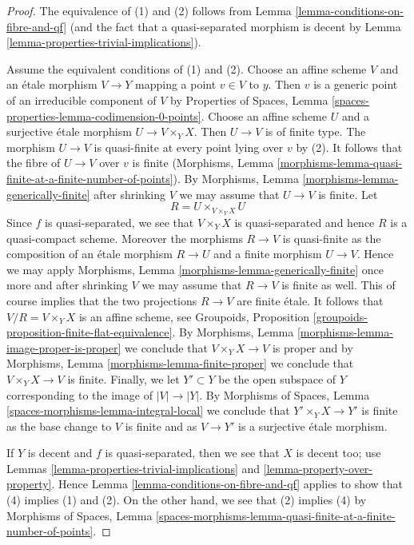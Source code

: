 \begin{proof}
The equivalence of (1) and (2) follows from
Lemma \ref{lemma-conditions-on-fibre-and-qf}
(and the fact that a quasi-separated morphism is decent by
Lemma \ref{lemma-properties-trivial-implications}).

\medskip\noindent
Assume the equivalent conditions of (1) and (2). Choose an affine scheme $V$
and an \'etale morphism $V \to Y$ mapping a point $v \in V$ to $y$. Then $v$
is a generic point of an irreducible component of $V$ by
Properties of Spaces, Lemma
\ref{spaces-properties-lemma-codimension-0-points}.
Choose an affine scheme $U$
and a surjective \'etale morphism $U \to V \times_Y X$. Then $U \to V$ is of
finite type. The morphism $U \to V$ is quasi-finite at every point lying over
$v$ by (2). It follows that the fibre of $U \to V$ over $v$ is finite
(Morphisms, Lemma
\ref{morphisms-lemma-quasi-finite-at-a-finite-number-of-points}). By
Morphisms, Lemma \ref{morphisms-lemma-generically-finite}
after shrinking $V$ we may assume that $U \to V$ is finite.
Let
$$
R = U \times_{V \times_Y X} U
$$
Since $f$ is quasi-separated, we see that $V \times_Y X$ is quasi-separated
and hence $R$ is a quasi-compact scheme. Moreover the morphisms
$R \to V$ is quasi-finite as the composition of an \'etale morphism
$R \to U$ and a finite morphism $U \to V$. Hence we may apply
Morphisms, Lemma \ref{morphisms-lemma-generically-finite}
once more and after shrinking $V$ we may assume that $R \to V$ is
finite as well. This of course implies that the two projections
$R \to V$ are finite \'etale. It follows that
$V/R = V \times_Y X$ is an affine scheme, see
Groupoids, Proposition \ref{groupoids-proposition-finite-flat-equivalence}.
By Morphisms, Lemma \ref{morphisms-lemma-image-proper-is-proper}
we conclude that $V \times_Y X \to V$ is proper and by
Morphisms, Lemma \ref{morphisms-lemma-finite-proper}
we conclude that $V \times_Y X \to V$ is finite.
Finally, we let $Y' \subset Y$ be the open subspace of $Y$
corresponding to the image of $|V| \to |Y|$.
By Morphisms of Spaces, Lemma \ref{spaces-morphisms-lemma-integral-local}
we conclude that $Y' \times_Y X \to Y'$ is finite as the base
change to $V$ is finite and as $V \to Y'$ is a surjective \'etale
morphism.

\medskip\noindent
If $Y$ is decent and $f$ is quasi-separated, then we see that
$X$ is decent too; use Lemmas
\ref{lemma-properties-trivial-implications} and
\ref{lemma-property-over-property}.
Hence Lemma \ref{lemma-conditions-on-fibre-and-qf}
applies to show that (4) implies (1) and (2). On the other hand,
we see that (2) implies (4) by Morphisms of Spaces, Lemma
\ref{spaces-morphisms-lemma-quasi-finite-at-a-finite-number-of-points}.
\end{proof}

